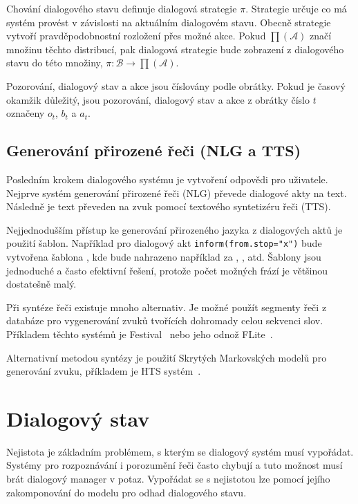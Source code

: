 Chování dialogového stavu definuje dialogová strategie $\pi$.
Strategie určuje co má systém provést v závislosti na aktuálním dialogovém stavu.
Obecně strategie vytvoří pravděpodobnostní rozložení přes možné akce.
Pokud $\prod(\mathcal{A})$ značí množinu těchto distribucí, pak dialogová strategie bude zobrazení z dialogového stavu do této množiny, $\pi: \mathcal{B} \longrightarrow \prod(\mathcal{A})$.

Pozorování, dialogový stav a akce jsou číslovány podle obrátky.
Pokud je časový okamžik důležitý, jsou pozorování, dialogový stav a akce z obrátky číslo $t$ označeny $o_t$, $b_t$ a $a_t$.

\subsection{Generování přirozené řeči (NLG a TTS)}

Posledním krokem dialogového systému je vytvoření odpovědi pro uživatele.
Nejprve systém generování přirozené řeči (NLG) převede dialogové akty na text.
Následně je text převeden na zvuk pomocí textového syntetizéru řeči (TTS).

Nejjednodušším přístup ke generování přirozeného jazyka z dialogových aktů je použití šablon.
Například pro dialogový akt {\tt inform(from.stop="x")} bude vytvořena šablona , kde  bude nahrazeno například za , , atd.
Šablony jsou jednoduché a často efektivní řešení, protože počet možných frází je většinou dostatešně malý.

Při syntéze řeči existuje mnoho alternativ.
Je možné použít segmenty řeči z databáze pro vygenerování zvuků tvořících dohromady celou sekvenci slov.
Příkladem těchto systémů je Festival~\cite{black2001festival} nebo jeho odnož  FLite~\cite{black2001flite}.

Alternativní metodou syntézy je použití Skrytých Markovských modelů pro generování zvuku, příkladem je HTS systém~\cite{zen2007hmm}.

\section{Dialogový stav}

Nejistota je základním problémem, s kterým se dialogový systém musí vypořádat.
Systémy pro rozpoznávání i porozumění řeči často chybují a tuto možnost musí brát dialogový manager v potaz.
Vypořádat se s nejistotou lze pomocí jejího zakomponování do modelu pro odhad dialogového stavu.

